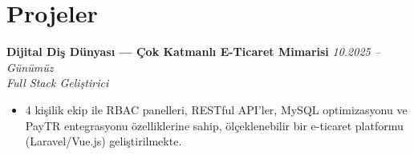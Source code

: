 \section{Projeler}

\textbf{Dijital Diş Dünyası — Çok Katmanlı E-Ticaret Mimarisi} \hfill \textit{10.2025 -- Günümüz} \\
\textit{Full Stack Geliştirici}
\begin{itemize}[leftmargin=1.5em, itemsep=0pt, topsep=2pt]
  \item 4 kişilik ekip ile RBAC panelleri, RESTful API'ler, MySQL optimizasyonu ve PayTR entegrasyonu özelliklerine sahip, ölçeklenebilir bir e-ticaret platformu (Laravel/Vue.js) geliştirilmekte.
\end{itemize}

